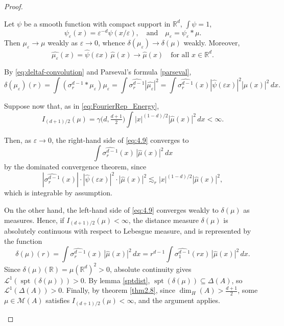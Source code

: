 \documentclass[12pt,a4paper]{report}
\theoremstyle{definition}
\begin{document}
\begin{proof}
\begin{itemize}
Let \( \psi \) be a smooth function with compact support in \( \mathbb{R}^d \), \( \int \psi = 1 \),
\[
\psi_\varepsilon(x) = \varepsilon^{-d} \psi(x / \varepsilon), \quad \text{and} \quad \mu_\varepsilon = \psi_\varepsilon * \mu.
\]
Then \( \mu_\varepsilon \to \mu \) weakly as \( \varepsilon \to 0 \), whence \( \delta(\mu_\varepsilon) \to \delta(\mu) \) weakly. Moreover,
\[
\widehat{\mu_\varepsilon}(x) = \widehat{\psi}(\varepsilon x) \, \widehat{\mu}(x) \to \widehat{\mu}(x)
\quad \text{for all } x \in \mathbb{R}^d.
\]

By \ref{eq:deltaf-convolution} and Parseval’s formula \ref{parseval},
\begin{equation}
\delta(\mu_\varepsilon)(r) = \int (\sigma_r^{d-1} * \mu_\varepsilon) \mu_\varepsilon
= \int \widehat{\sigma_r^{d-1}} |\widehat{\mu_\varepsilon}|^2
= \int \widehat{\sigma_r^{d-1}}(x) |\widehat{\psi}(\varepsilon x)|^2 |\widehat{\mu}(x)|^2 \, dx.
\label{eq:4.9}
\end{equation}

Suppose now that, as in \eqref{eq:FourierRep_Energy},
\[ \label{eq:delta-mu-eps}
I_{(d+1)/2}(\mu) = \gamma\big(d, \tfrac{d+1}{2}\big) \int |x|^{(1-d)/2} |\widehat{\mu}(x)|^2 \, dx < \infty.
\]

Then, as \( \varepsilon \to 0 \), the right-hand side of \eqref{eq:4.9} converges to
\[
\int \widehat{\sigma_r^{d-1}}(x)\, |\widehat{\mu}(x)|^2 \, dx
\]
by the dominated convergence theorem, since
\[
|\widehat{\sigma_r^{d-1}}(x)| \cdot |\widehat{\psi}(\varepsilon x)|^2 \cdot |\widehat{\mu}(x)|^2
\lesssim_r |x|^{(1-d)/2} |\widehat{\mu}(x)|^2,
\]
which is integrable by assumption.

On the other hand, the left-hand side of \eqref{eq:4.9} converges weakly to \( \delta(\mu) \) as measures. Hence, if \( I_{(d+1)/2}(\mu) < \infty \), the distance measure \( \delta(\mu) \) is absolutely continuous with respect to Lebesgue measure, and is represented by the function
\begin{equation}
\delta(\mu)(r) = \int \widehat{\sigma_r^{d-1}}(x)\, |\widehat{\mu}(x)|^2 \, dx
= r^{d-1} \int \widehat{\sigma_1^{d-1}}(r x)\, |\widehat{\mu}(x)|^2 \, dx. \label{eq:delta-mu-limit}
\end{equation}
Since \( \delta(\mu)(\mathbb{R}) = \mu(\mathbb{R}^d)^2 > 0 \), absolute continuity gives \( \mathcal{L}^1(\operatorname{spt}(\delta(\mu))) > 0 \). By lemma \ref{sptdist}, \( \operatorname{spt}(\delta(\mu)) \subseteq \Delta(A) \), so \( \mathcal{L}^1(\Delta(A)) > 0 \). Finally, by theorem \ref{thm2.8}, since \( \dim_H(A) > \frac{d+1}{2} \), some \( \mu \in \mathcal{M}(A) \) satisfies \( I_{(d+1)/2}(\mu) < \infty \), and the argument applies.


\end{itemize}
\end{proof}
\end{document}
